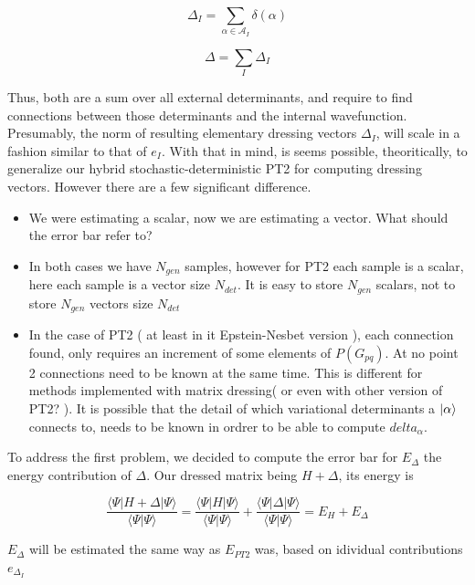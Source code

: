 \documentclass[./thesis.tex]{subfiles}
\begin{document}
\begin{equation}
\Delta_I = \sum_{\alpha \in \mathcal{A}_I} \delta(\alpha)
\end{equation}


\begin{equation}
\Delta = \sum_{I} \Delta_I
\end{equation}

Thus, both are a sum over all external determinants, and require to find connections between those determinants and the internal wavefunction. Presumably, the norm of resulting elementary dressing vectors $\Delta_I$, will scale in a fashion similar to that of $e_I$.
With that in mind, is seems possible, theoritically, to generalize our hybrid stochastic-deterministic PT2 for computing dressing vectors.
However there are a few significant difference.
\begin{itemize}
\item
We were estimating a scalar, now we are estimating a vector. What should the error bar refer to?
\item
In both cases we have $N_{gen}$ samples, however for PT2 each sample is a scalar, here each sample is a vector size $N_{det}$. It is easy to store $N_{gen}$ scalars, not to store $N_{gen}$ vectors size $N_{det}$
\item
In the case of PT2 ( at least in it Epstein-Nesbet version ), each connection found, only requires an increment of some elements of $P(G_{pq})$. At no point 2 connections need to be known at the same time. This is different for methods implemented with matrix dressing( or even with other version of PT2? ). It is possible that the detail of which variational determinants a $\ket \alpha$ connects to, needs to be known in ordrer to be able to compute $delta_\alpha$.
\end{itemize}

To address the first problem, we decided to compute the error bar for $E_{\Delta}$ the energy contribution of $\Delta$. Our dressed matrix being $H + \Delta$, its energy is
    
\begin{equation}
\frac{\langle \Psi |H + \Delta | \Psi\rangle}{\langle \Psi | \Psi \rangle} = \frac{\langle \Psi |H  | \Psi\rangle}{\langle \Psi | \Psi \rangle} + \frac{\langle \Psi |\Delta | \Psi\rangle}{\langle \Psi | \Psi \rangle} = E_H + E_{\Delta} 
\end{equation}


$E_{\Delta}$ will be estimated the same way as $E_{PT2}$ was, based on idividual contributions $e_{\Delta_I}$
\end{document}
